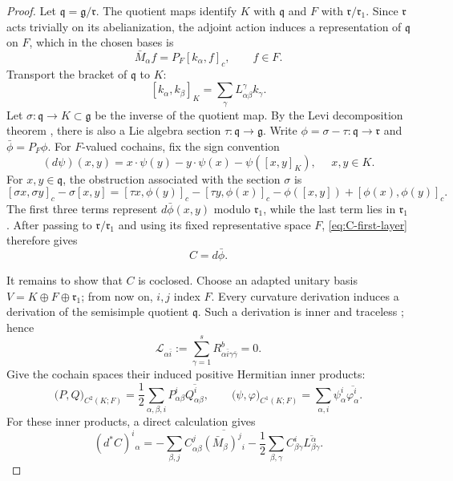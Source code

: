 \documentclass{amsart}
\begin{document}
\begin{proof}
Let $\mathfrak q=\mathfrak g/\mathfrak r$.  The quotient maps identify
$K$ with $\mathfrak q$ and $F$ with
$\mathfrak r/\mathfrak r_1$.  Since $\mathfrak r$ acts trivially on its
abelianization, the adjoint action induces a representation of
$\mathfrak q$ on $F$, which in the chosen bases is
\[
 \bar M_\alpha f=P_F[k_\alpha,f]_c,\qquad f\in F.
\]
Transport the bracket of $\mathfrak q$ to $K$:
\[
 [k_\alpha,k_\beta]_K
 =\sum_\gamma L^\gamma_{\alpha\beta}k_\gamma.
\]
Let $\sigma\colon\mathfrak q\to K\subset\mathfrak g$ be the inverse of the
quotient map.  By the Levi decomposition theorem
\cite{JacobsonLieAlgebras}, there is also a Lie algebra section
$\tau\colon\mathfrak q\to\mathfrak g$.  Write
$\phi=\sigma-\tau\colon\mathfrak q\to\mathfrak r$ and
$\bar\phi=P_F\phi$.  For $F$-valued cochains, fix the sign convention
\[
 (d\psi)(x,y)
 =x\mathbin{\cdot}\psi(y)-y\mathbin{\cdot}\psi(x)-\psi([x,y]_K), \ \ \ \ \ \ x,y\in K.
\]
For $x,y\in\mathfrak q$, the obstruction associated with the section
$\sigma$ is
\[
 [\sigma x,\sigma y]_c-\sigma[x,y]
 =[\tau x,\phi(y)]_c-[\tau y,\phi(x)]_c
  -\phi([x,y])+[\phi(x),\phi(y)]_c.
\]
The first three terms represent $d\bar\phi(x,y)$ modulo
$\mathfrak r_1$, while the last term lies in $\mathfrak r_1$.  After passing to
$\mathfrak r/\mathfrak r_1$ and using its fixed representative space $F$,
\eqref{eq:C-first-layer} therefore gives
\begin{equation}\label{eq:C-coboundary}
 C=d\bar\phi.
\end{equation}


It remains to show that $C$ is coclosed.  Choose an adapted unitary basis
$V=K\oplus F\oplus\mathfrak r_1$; from now on, $i,j$ index $F$.
Every curvature derivation induces a derivation of the semisimple quotient
$\mathfrak q$.  Such a derivation is inner and traceless
\cite{JacobsonLieAlgebras}; hence
\begin{equation}\label{eq:quotient-trace-zero}
 {\mathcal L}_{\alpha\bar{i}}
 :=\sum_{\gamma=1}^s
 R^b_{\alpha\bar{i}\gamma\bar\gamma}=0.
\end{equation}
Give the cochain spaces their induced positive Hermitian inner products:
\[
 \big({P},{Q}\big)_{C^2(K;F)}=\frac{1}{2}\sum_{\alpha,\beta,i}
 P^i_{\alpha\beta}\overline{Q^i_{\alpha\beta}},
 \qquad
 \big({\psi},{\varphi}\big)_{C^1(K;F)}=\sum_{\alpha,i}
 \psi^i_\alpha\overline{\varphi^i_\alpha}.
\]
For these inner products, a direct calculation gives
\begin{equation}\label{eq:d-star}
 (d^*C)^i{}_{\alpha}
 =-\sum_{\beta,j}C^j_{\alpha\beta}
     \overline{(\bar M_\beta)^j{}_{i}}
  -\frac{1}{2}\sum_{\beta,\gamma}C^i_{\beta\gamma}
     \overline{L^\alpha_{\beta\gamma}}.
\end{equation}


\end{proof}
\end{document}
